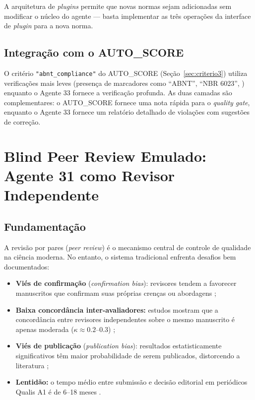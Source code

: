 A arquitetura de \textit{plugins} permite que novas normas sejam
adicionadas sem modificar o núcleo do agente — basta implementar as
três operações da interface de \textit{plugin} para a nova norma.

\subsection{Integração com o AUTO\_SCORE}
\label{sec:abnt_autoscore}

O critério \texttt{"abnt\_compliance"} do AUTO\_SCORE
(Seção~\ref{sec:criterio3}) utiliza verificações mais leves
(presença de marcadores como ``ABNT'', ``NBR 6023'',
\verb||) enquanto o Agente 33 fornece a verificação
profunda. As duas camadas são complementares: o AUTO\_SCORE fornece
uma nota rápida para o \textit{quality gate}, enquanto o Agente 33
fornece um relatório detalhado de violações com sugestões de
correção.

\section{Blind Peer Review Emulado: Agente 31 como Revisor Independente}
\label{sec:peerreview}

\subsection{Fundamentação}
\label{sec:peerreview_fundamentacao}

A revisão por pares (\textit{peer review}) é o mecanismo central de
controle de qualidade na ciência moderna. No entanto, o sistema
tradicional enfrenta desafios bem documentados:

\begin{itemize}
    \item \textbf{Viés de confirmação} (\textit{confirmation bias}):
    revisores tendem a favorecer manuscritos que confirmam suas
    próprias crenças ou abordagens \cite{Mahoney1977_ConfirmationBias,
    Nickerson1998_ConfirmationBias};

    \item \textbf{Baixa concordância inter-avaliadores:} estudos
    mostram que a concordância entre revisores independentes sobre
    o mesmo manuscrito é apenas moderada
    ($\kappa \approx 0.2$--$0.3$) \cite{Cicchetti1991_Reliability,
    Bornmann2011_Reliability};

    \item \textbf{Viés de publicação} (\textit{publication bias}):
    resultados estatisticamente significativos têm maior
    probabilidade de serem publicados, distorcendo a literatura
    \cite{Rosenthal1979_FileDrawer, Fanelli2012_NegativeResults};

    \item \textbf{Lentidão:} o tempo médio entre submissão e
    decisão editorial em periódicos Qualis A1 é de 6--18 meses
    \cite{Bjork2013_Delay}.
\end{itemize}

